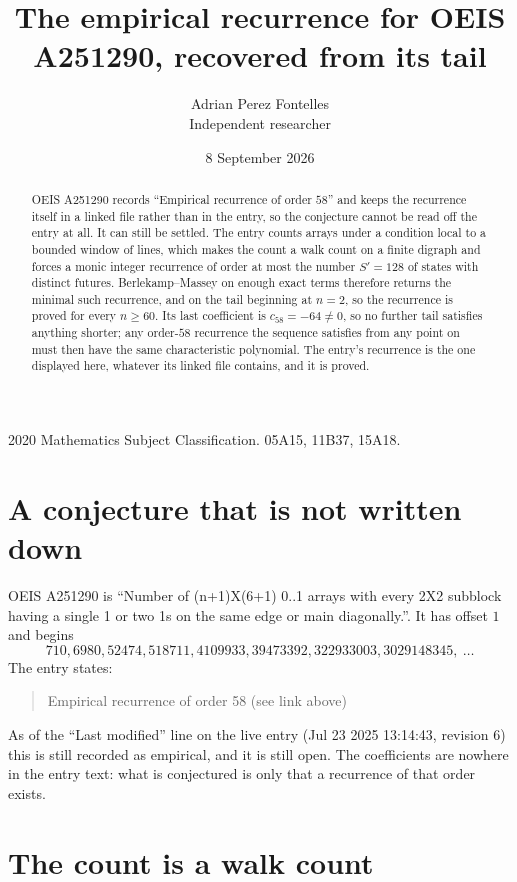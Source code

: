 \documentclass[11pt,a4paper]{article}
\title{The empirical recurrence for OEIS A251290, recovered from its tail}
\author{Adrian Perez Fontelles\\ \small Independent researcher}
\date{8 September 2026}
\theoremstyle{plain}
\theoremstyle{definition}
\begin{document}
\maketitle

\begin{abstract}
OEIS A251290 records ``Empirical recurrence of order $58$'' and keeps the recurrence itself in
a linked file rather than in the entry, so the conjecture cannot be read off the entry at all.
It can still be settled. The entry counts arrays under a condition local to a bounded window of
lines, which makes the count a walk count on a finite digraph and forces a monic integer
recurrence of order at most the number $S'=128$ of states with distinct futures. Berlekamp--Massey on
enough exact terms therefore returns the minimal such recurrence, and on the tail beginning at $n=2$, so the recurrence is proved for every $n\ge60$.
Its last coefficient is $c_{58}=-64\neq0$, so no further tail satisfies anything
shorter; any order-$58$ recurrence the sequence satisfies from any point on must then have
the same characteristic polynomial. The entry's recurrence is the one displayed here, whatever
its linked file contains, and it is proved.
\end{abstract}

\noindent\small 2020 Mathematics Subject Classification. 05A15, 11B37, 15A18.\normalsize

\section{A conjecture that is not written down}

OEIS A251290 is ``Number of (n+1)X(6+1) 0..1 arrays with every 2X2 subblock having a single 1 or two 1s on the same edge or main diagonally.''. It has offset $1$ and begins
\[
710, 6980, 52474, 518711, 4109933, 39473392, 322933003, 3029148345,\ \dots
\]
The entry states:
\begin{quote}
Empirical recurrence of order 58 (see link above)
\end{quote}
As of the ``Last modified'' line on the live entry (Jul 23 2025 13:14:43, revision 6)
this is still recorded as empirical, and it is still open. The coefficients are nowhere in the
entry text: what is conjectured is only that a recurrence of that order exists.

\section{The count is a walk count}
\end{document}
